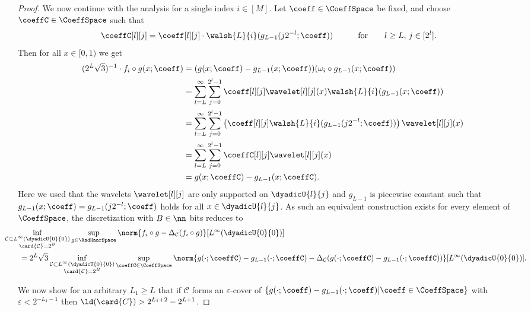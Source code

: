 \documentclass[twoside,11pt]{article}
\newcommand{\set}[1]{\ensuremath{\mathcal{#1}}}
\begin{document}
\begin{proof}
We now continue with the analysis for a single index $i\in[M]$.
Let $\coeff\in\CoeffSpace$ be fixed, and choose $\coeffC\in\CoeffSpace$ such that
\begin{alignat}{2}
    \coeffC[l][j]&=\coeff[l][j]\cdot\walsh{L}{i}(g_{L-1}(j2^{-l};\coeff))\qquad&&\text{for}\qquad l\geq L,\,j\in[2^l].
\end{alignat}
Then for all $x\in [0,1)$ we get
\begin{align}
    (2^{L}\sqrt{3})^{-1}\cdot f_i\circ g(x;\coeff)&=(g(x;\coeff)-g_{L-1}(x;\coeff))(\omega_i\circ g_{L-1}(x;\coeff))
    \\&
    =
    \sum_{l=L}^\infty\sum_{j=0}^{2^l-1}\coeff[l][j]\wavelet[l][j](x) \walsh{L}{i}(g_{L-1}(x;\coeff))
    \\&
    =
    \sum_{l=L}^\infty\sum_{j=0}^{2^l-1}\left(\coeff[l][j] \walsh{L}{i}(g_{L-1}(j2^{-l};\coeff))\right)\wavelet[l][j](x)
    \\&
    =
    \sum_{l=L}^\infty\sum_{j=0}^{2^l-1}\coeffC[l][j]\wavelet[l][j](x)
    \\&
    =
    g(x;\coeffC)-g_{L-1}(x;\coeffC).
\end{align}
Here we used that the wavelets $\wavelet[l][j]$ are only supported on $\dyadicU{l}{j}$ and $g_{L-1}$ is piecewise constant such that $g_{L-1}(x;\coeff)=g_{L-1}(j2^{-l};\coeff)$ holds for all $x\in\dyadicU{l}{j}$.
As such an equivalent construction exists for every element of $\CoeffSpace$, the discretization with $B\in\nn$ bits reduces to
\begin{align}
    &\kern-2em\inf_{\substack{\set{C}\subset L^\infty(\dyadicU{0}{0})\\\card{\set{C}}=2^B}}\sup_{g\in\RadHaarSpace}\norm{f_i\circ g-\Delta_{\set{C}}(f_i\circ g)}[{L^\infty(\dyadicU{0}{0})}]
    \\&
    =
    2^L\sqrt{3}\inf_{\substack{\set{C}\subset L^\infty(\dyadicU{0}{0})\\\card{\set{C}}=2^B}}\sup_{\coeffC\in\CoeffSpace}\norm{g(\cdot;\coeffC)-g_{L-1}(\cdot;\coeffC)-\Delta_{\set{C}}(g(\cdot;\coeffC)-g_{L-1}(\cdot;\coeffC))}[{L^\infty(\dyadicU{0}{0})}].
\end{align}

We now show for an arbitrary $L_1\geq L$ that if $\set{C}$ forms an $\varepsilon$-cover of $\{g(\cdot;\coeff)-g_{L-1}(\cdot;\coeff)|\coeff\in\CoeffSpace\}$ with $\varepsilon<2^{-L_1-1}$ then $\ld(\card{C})> 2^{L_1+2}-2^{L+1}$.


\end{proof}
\end{document}
